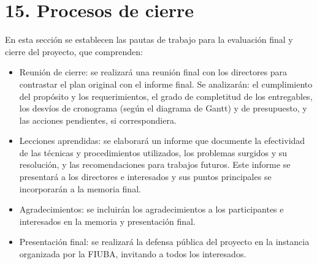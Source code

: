 \documentclass[
11pt, %
codirector, %
]{charter}
\begin{document}
\section{15. Procesos de cierre}    
\label{sec:cierre}

En esta sección se establecen las pautas de trabajo para la evaluación final y cierre del proyecto, que comprenden:
\begin{itemize}
	\item Reunión de cierre: se realizará una reunión final con los directores para  contrastar el plan original con el informe final. Se analizarán: el cumplimiento del propósito y los requerimientos, el grado de completitud de los entregables, los desvíos de cronograma (según el diagrama de Gantt) y de presupuesto, y las acciones pendientes, si correspondiera.
	\item Lecciones aprendidas: se elaborará un informe que documente la efectividad de las técnicas y procedimientos utilizados, los problemas surgidos y su resolución, y las recomendaciones para trabajos futuros. Este informe se presentará a los directores e interesados y sus puntos principales se incorporarán a la memoria final.
	\item Agradecimientos: se incluirán los agradecimientos a los participantes e interesados en la memoria y presentación final.
	\item Presentación final: se realizará la defensa pública del proyecto en la instancia organizada por la FIUBA, invitando a todos los interesados.
\end{itemize}
\end{document}
